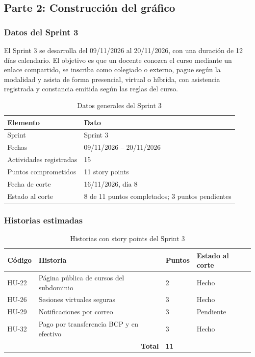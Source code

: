 \documentclass[12pt,a4paper]{article}
\begin{document}
\subsection{Parte 2: Construcción del gráfico}

\subsubsection{Datos del Sprint 3}

El Sprint 3 se desarrolla del 09/11/2026 al 20/11/2026, con una duración de
12 días calendario. El objetivo es que un docente conozca el curso mediante
un enlace compartido, se inscriba como colegiado o externo, pague según la
modalidad y asista de forma presencial, virtual o híbrida, con asistencia
registrada y constancia emitida según las reglas del curso.

\begin{table}[h]
\centering
\caption{Datos generales del Sprint 3}
\label{tab:datosSprint3}
\begin{tabular}{p{5cm}p{8.5cm}}
\toprule
\textbf{Elemento} & \textbf{Dato}\\
\midrule
Sprint & Sprint 3\\
Fechas & 09/11/2026 -- 20/11/2026\\
Actividades registradas & 15\\
Puntos comprometidos & 11 story points\\
Fecha de corte & 16/11/2026, día 8\\
Estado al corte & 8 de 11 puntos completados; 3 puntos pendientes\\
\bottomrule
\end{tabular}
\end{table}

\subsubsection{Historias estimadas}

\begin{table}[h]
\centering
\caption{Historias con story points del Sprint 3}
\label{tab:historiasSprint3}
\begin{tabular}{p{2cm}p{6.5cm}p{2.3cm}p{3cm}}
\toprule
\textbf{Código} & \textbf{Historia} & \textbf{Puntos} & \textbf{Estado al corte}\\
\midrule
HU-22 & Página pública de cursos del subdominio & 2 & Hecho\\
HU-26 & Sesiones virtuales seguras & 3 & Hecho\\
HU-29 & Notificaciones por correo & 3 & Pendiente\\
HU-32 & Pago por transferencia BCP y en efectivo & 3 & Hecho\\
\midrule
\multicolumn{2}{r}{\textbf{Total}} & \textbf{11} & \\
\bottomrule
\end{tabular}
\end{table}
\end{document}
